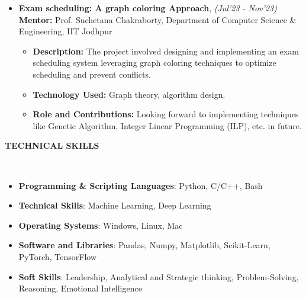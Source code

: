 \documentclass[a4paper,10pt]{article}
\newcommand{\resheading}[1]{{\small \colorbox{mygrey}{\begin{minipage}{0.99\textwidth}{\textbf{#1 \vphantom{p^{E}}}}\end{minipage}}}}
\begin{document}
\begin{itemize}[noitemsep,nolistsep]
\item \textbf{Exam scheduling: A graph coloring Approach}, \emph{(Jul'23 - Nov'23)}\hfill \\
\textbf{Mentor:} {Prof. Suchetana Chakraborty, Department of Computer Science \& Engineering, IIT Jodhpur}
\begin{itemize}[noitemsep,nolistsep]
    \item \textbf{Description:} The project involved designing and implementing an exam scheduling system leveraging graph coloring techniques to optimize scheduling and prevent conflicts.
    \item \textbf{Technology Used:} Graph theory, algorithm design.
    \item \textbf{Role and Contributions:} Looking forward to implementing techniques like Genetic Algorithm, Integer Linear Programming (ILP), etc. in future.
\end{itemize}
\end{itemize}





\noindent
\resheading{\textbf{TECHNICAL SKILLS}}\\[-0.4cm]
\begin{itemize}
  \item \textbf{Programming \& Scripting Languages}: Python, C/C++, Bash\\[-0.6cm]
  \item \textbf{Technical Skills}: Machine Learning, Deep Learning\\[-0.6cm]
  \item \textbf{Operating Systems}: Windows, Linux, Mac\\[-0.6cm]
  \item \textbf{Software and Libraries}: Pandas, Numpy, Matplotlib, Scikit-Learn, PyTorch, TensorFlow\\[-0.6cm]
  \item \textbf{Soft Skills}: Leadership, Analytical and Strategic thinking, Problem-Solving, Reasoning, Emotional Intelligence
\end{itemize}
\end{document}
